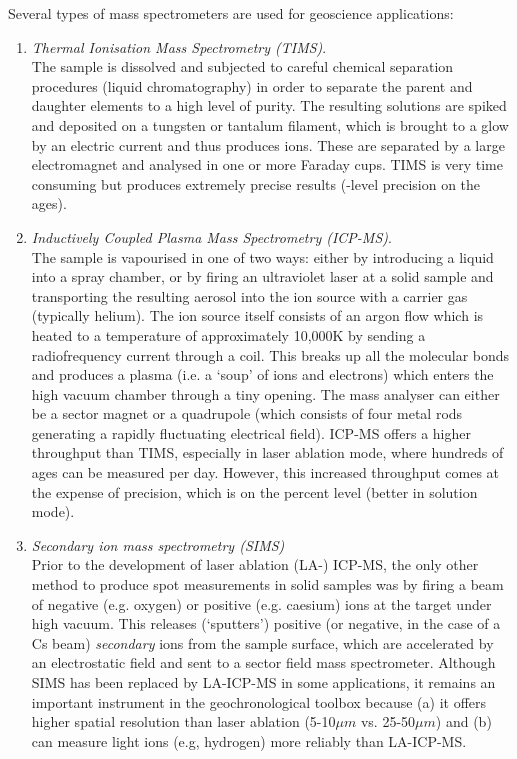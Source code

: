 \documentclass{book}
\begin{document}
Several types of mass spectrometers are used for geoscience
applications:

\begin{enumerate}
\item{\emph{Thermal Ionisation Mass Spectrometry (TIMS)}.}\\ The
  sample is dissolved and subjected to careful chemical separation
  procedures (liquid chromatography) in order to separate the parent
  and daughter elements to a high level of purity. The resulting
  solutions are spiked and deposited on a tungsten or tantalum
  filament, which is brought to a glow by an electric current and thus
  produces ions. These are separated by a large electromagnet and
  analysed in one or more Faraday cups. TIMS is very time consuming
  but produces extremely precise results (\permil-level precision on
  the ages).
 
\item{\emph{Inductively Coupled Plasma Mass Spectrometry
    (ICP-MS)}.}\\ The sample is vapourised in one of two ways: either
  by introducing a liquid into a spray chamber, or by firing an
  ultraviolet laser at a solid sample and transporting the resulting
  aerosol into the ion source with a carrier gas (typically
  helium). The ion source itself consists of an argon flow which is
  heated to a temperature of approximately 10,000K by sending a
  radiofrequency current through a coil. This breaks up all the
  molecular bonds and produces a plasma (i.e. a `soup' of ions and
  electrons) which enters the high vacuum chamber through a tiny
  opening.  The mass analyser can either be a sector magnet or a
  quadrupole (which consists of four metal rods generating a rapidly
  fluctuating electrical field). ICP-MS offers a higher throughput
  than TIMS, especially in laser ablation mode, where hundreds of ages
  can be measured per day. However, this increased throughput comes at
  the expense of precision, which is on the percent level (better in
  solution mode).

\item{\emph{Secondary ion mass spectrometry (SIMS)}}\\ Prior to the
  development of laser ablation (LA-) ICP-MS, the only other method to
  produce spot measurements in solid samples was by firing a beam of
  negative (e.g. oxygen) or positive (e.g. caesium) ions at the target
  under high vacuum.  This releases (`sputters') positive (or
  negative, in the case of a Cs beam) \emph{secondary} ions from the
  sample surface, which are accelerated by an electrostatic field and
  sent to a sector field mass spectrometer. Although SIMS has been
  replaced by LA-ICP-MS in some applications, it remains an important
  instrument in the geochronological toolbox because (a) it offers
  higher spatial resolution than laser ablation (5-10$\mu m$
  vs. 25-50$\mu m$) and (b) can measure light ions (e.g, hydrogen)
  more reliably than LA-ICP-MS.


\end{enumerate}
\end{document}
